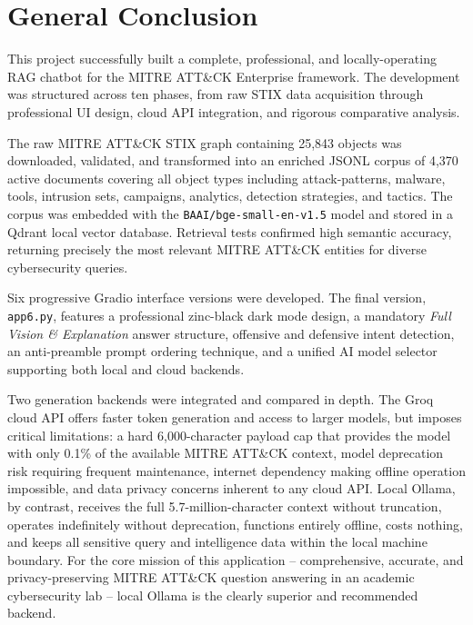 \documentclass[12pt,a4paper]{report}
\newcommand{\ATTACK}{MITRE ATT\&CK}
\begin{document}

\chapter*{General Conclusion}

This project successfully built a complete, professional, and locally-operating RAG chatbot for the \ATTACK{} Enterprise framework. The development was structured across ten phases, from raw STIX data acquisition through professional UI design, cloud API integration, and rigorous comparative analysis.

The raw \ATTACK{} STIX graph containing 25,843 objects was downloaded, validated, and transformed into an enriched JSONL corpus of 4,370 active documents covering all object types including attack-patterns, malware, tools, intrusion sets, campaigns, analytics, detection strategies, and tactics. The corpus was embedded with the \texttt{BAAI/bge-small-en-v1.5} model and stored in a Qdrant local vector database. Retrieval tests confirmed high semantic accuracy, returning precisely the most relevant \ATTACK{} entities for diverse cybersecurity queries.

Six progressive Gradio interface versions were developed. The final version, \texttt{app6.py}, features a professional zinc-black dark mode design, a mandatory \textit{Full Vision \& Explanation} answer structure, offensive and defensive intent detection, an anti-preamble prompt ordering technique, and a unified AI model selector supporting both local and cloud backends.

Two generation backends were integrated and compared in depth. The Groq cloud API offers faster token generation and access to larger models, but imposes critical limitations: a hard 6,000-character payload cap that provides the model with only 0.1\% of the available \ATTACK{} context, model deprecation risk requiring frequent maintenance, internet dependency making offline operation impossible, and data privacy concerns inherent to any cloud API. Local Ollama, by contrast, receives the full 5.7-million-character context without truncation, operates indefinitely without deprecation, functions entirely offline, costs nothing, and keeps all sensitive query and intelligence data within the local machine boundary. For the core mission of this application -- comprehensive, accurate, and privacy-preserving \ATTACK{} question answering in an academic cybersecurity lab -- local Ollama is the clearly superior and recommended backend.
\end{document}
